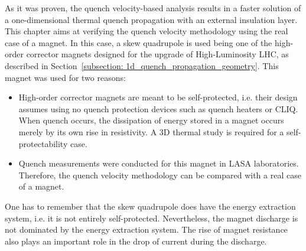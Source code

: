 
As it was proven, the quench velocity-based analysis results in a faster solution of a one-dimensional thermal quench propagation with an external insulation layer. This chapter aims at verifying the quench velocity methodology using the real case of a magnet. In this case, a skew quadrupole is used being one of the high-order corrector magnets designed for the upgrade of High-Luminosity LHC, as described in Section~\ref{subsection: 1d_quench_propagation_geometry}. This magnet was used for two reasons: 
\begin{itemize}
    \item High-order corrector magnets are meant to be self-protected, i.e. their design assumes using no quench protection devices such as quench heaters or CLIQ. When quench occurs, the dissipation of energy stored in a magnet occurs merely by its own rise in resistivity. A 3D thermal study is required for a self-protectability case.
    \item Quench measurements were conducted for this magnet in LASA laboratories. Therefore, the quench velocity methodology can be compared with a real case of a magnet.
\end{itemize}

One has to remember that the skew quadrupole does have the energy extraction system, i.e. it is not entirely self-protected. Nevertheless, the magnet discharge is not dominated by the energy extraction system. The rise of magnet resistance also plays an important role in the drop of current during the discharge.
